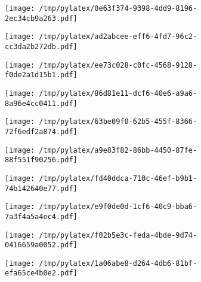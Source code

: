 \documentclass{article}
\begin{document}
\begin{figure}[htbp]
\begin{subfigure}[b]{.3\linewidth}
\texttt{[image: /tmp/pylatex/0e63f374-9398-4dd9-8196-2ec34cb9a263.pdf]}
\end{subfigure}
\begin{subfigure}[b]{.3\linewidth}
\texttt{[image: /tmp/pylatex/ad2abcee-eff6-4fd7-96c2-cc3da2b272db.pdf]}
\end{subfigure}
\begin{subfigure}[b]{.3\linewidth}
\texttt{[image: /tmp/pylatex/ee73c028-c0fc-4568-9128-f0de2a1d15b1.pdf]}
\end{subfigure}
\begin{subfigure}[b]{.3\linewidth}
\texttt{[image: /tmp/pylatex/86d81e11-dcf6-40e6-a9a6-8a96e4cc0411.pdf]}
\end{subfigure}
\begin{subfigure}[b]{.3\linewidth}
\texttt{[image: /tmp/pylatex/63be09f0-62b5-455f-8366-72f6edf2a874.pdf]}
\end{subfigure}
\begin{subfigure}[b]{.3\linewidth}
\texttt{[image: /tmp/pylatex/a9e83f82-86bb-4450-87fe-88f551f90256.pdf]}
\end{subfigure}
\begin{subfigure}[b]{.3\linewidth}
\texttt{[image: /tmp/pylatex/fd40ddca-710c-46ef-b9b1-74b142640e77.pdf]}
\end{subfigure}
\begin{subfigure}[b]{.3\linewidth}
\texttt{[image: /tmp/pylatex/e9f0de0d-1cf6-40c9-bba6-7a3f4a5a4ec4.pdf]}
\end{subfigure}
\begin{subfigure}[b]{.3\linewidth}
\texttt{[image: /tmp/pylatex/f02b5e3c-feda-4bde-9d74-0416659a0052.pdf]}
\end{subfigure}
\begin{subfigure}[b]{.3\linewidth}
\texttt{[image: /tmp/pylatex/1a06abe8-d264-4db6-81bf-efa65ce4b0e2.pdf]}
\end{subfigure}
\end{figure}
\end{document}
